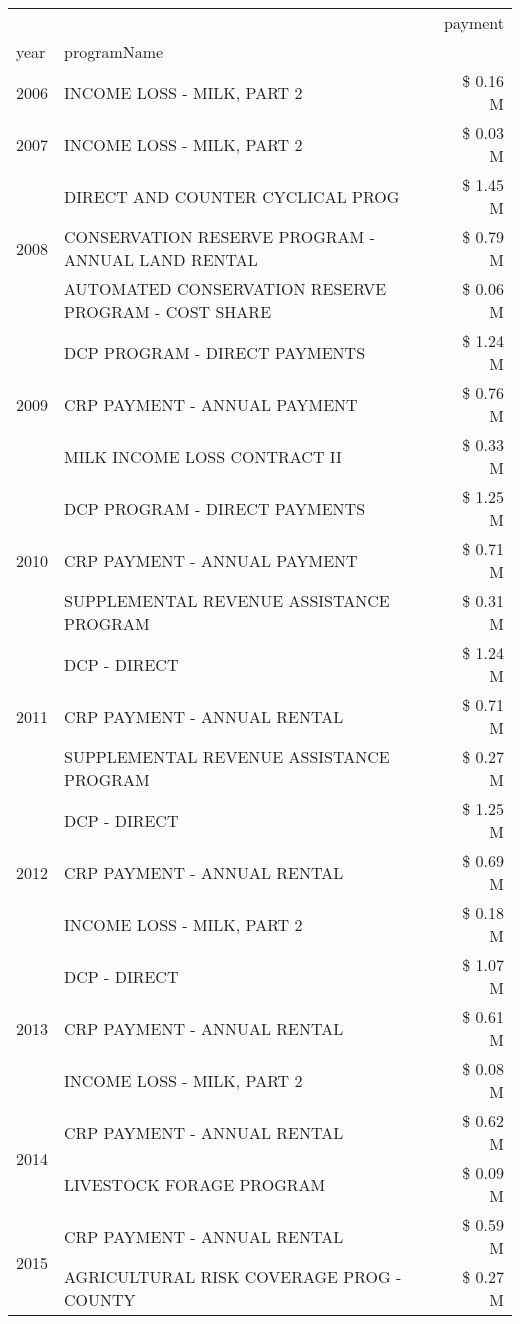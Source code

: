 \begin{tabular}{llr}
\toprule
 &  & payment \\
year & programName &  \\
\midrule
2006 & INCOME LOSS - MILK, PART 2 & \$ 0.16 M \\
\cline{1-3}
2007 & INCOME LOSS - MILK, PART 2 & \$ 0.03 M \\
\cline{1-3}
\multirow[t]{3}{*}{2008} & DIRECT AND COUNTER CYCLICAL PROG & \$ 1.45 M \\
 & CONSERVATION RESERVE PROGRAM - ANNUAL LAND RENTAL & \$ 0.79 M \\
 & AUTOMATED CONSERVATION RESERVE PROGRAM - COST SHARE & \$ 0.06 M \\
\cline{1-3}
\multirow[t]{3}{*}{2009} & DCP PROGRAM - DIRECT PAYMENTS & \$ 1.24 M \\
 & CRP PAYMENT - ANNUAL PAYMENT & \$ 0.76 M \\
 & MILK INCOME LOSS CONTRACT II & \$ 0.33 M \\
\cline{1-3}
\multirow[t]{3}{*}{2010} & DCP PROGRAM - DIRECT PAYMENTS & \$ 1.25 M \\
 & CRP PAYMENT - ANNUAL PAYMENT & \$ 0.71 M \\
 & SUPPLEMENTAL REVENUE ASSISTANCE PROGRAM & \$ 0.31 M \\
\cline{1-3}
\multirow[t]{3}{*}{2011} & DCP - DIRECT & \$ 1.24 M \\
 & CRP PAYMENT - ANNUAL RENTAL & \$ 0.71 M \\
 & SUPPLEMENTAL REVENUE ASSISTANCE PROGRAM & \$ 0.27 M \\
\cline{1-3}
\multirow[t]{3}{*}{2012} & DCP - DIRECT & \$ 1.25 M \\
 & CRP PAYMENT - ANNUAL RENTAL & \$ 0.69 M \\
 & INCOME LOSS - MILK, PART 2 & \$ 0.18 M \\
\cline{1-3}
\multirow[t]{3}{*}{2013} & DCP - DIRECT & \$ 1.07 M \\
 & CRP PAYMENT - ANNUAL RENTAL & \$ 0.61 M \\
 & INCOME LOSS - MILK, PART 2 & \$ 0.08 M \\
\cline{1-3}
\multirow[t]{2}{*}{2014} & CRP PAYMENT - ANNUAL RENTAL & \$ 0.62 M \\
 & LIVESTOCK FORAGE PROGRAM & \$ 0.09 M \\
\cline{1-3}
\multirow[t]{3}{*}{2015} & CRP PAYMENT - ANNUAL RENTAL & \$ 0.59 M \\
 & AGRICULTURAL RISK COVERAGE PROG - COUNTY & \$ 0.27 M \\

\end{tabular}
